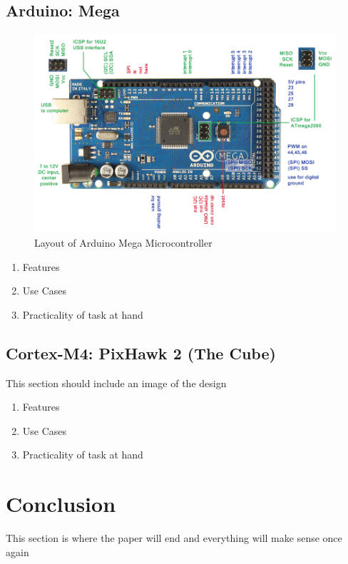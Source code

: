 \documentclass[conference,12pt, ]{IEEEtran}
\begin{document}
\subsection{Arduino: Mega}
\begin{figure}
	\includegraphics[scale=0.25]{mega.png}
	\caption {Layout of Arduino Mega  Microcontroller}
\end{figure}
	\begin{enumerate}
		\item Features
		\item Use Cases
		\item Practicality of task at hand 
	\end{enumerate}

\subsection{Cortex-M4: PixHawk 2 (The Cube)}
This section should include an image of the design
	\begin{enumerate}
		\item Features
		\item Use Cases
		\item Practicality of task at hand 
	\end{enumerate}


\section{Conclusion}
This section is where the paper will end and everything will make sense once again
\end{document}
